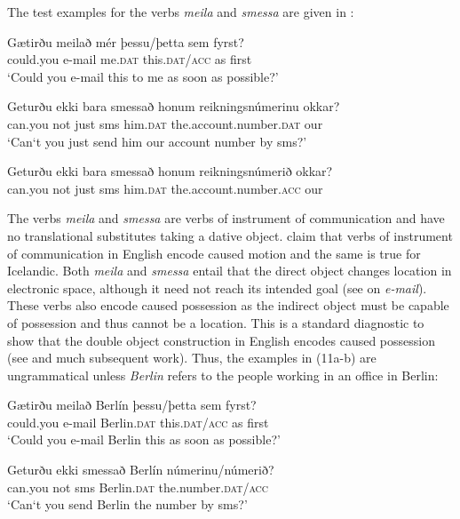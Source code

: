 \documentclass[output=paper,modfonts,nonflat]{langsci/langscibook}
\begin{document}
The test examples for the verbs \textit{meila} and \textit{smessa} are given in :

\ea%
    \label{ex:jonsson:10}  
\ea
\gll  Gætirðu  meilað  mér  þessu/þetta  sem  fyrst?\\
   could.you  e-mail  me.\textsc{dat}  this.\textsc{dat/acc}  as  first\\
\glt `Could you e-mail this to me as soon as possible?' 

\ex
\gll   Geturðu  ekki  bara  smessað  honum  reikningsnúmerinu  okkar?\\
 can.you  not  just  sms  him.\textsc{dat}  the.account.number.\textsc{dat}  our\\
\glt `Can‘t you just send him our account number by sms?' 

\ex
\gll   Geturðu  ekki  bara  smessað  honum  reikningsnúmerið  okkar?\\
 can.you  not  just  sms  him.\textsc{dat}  the.account.number.\textsc{acc}  our\\
\z
\z
 
The verbs \textit{meila} and \textit{smessa} are verbs of instrument of communication and have no translational substitutes taking a dative object.  \citet{RappaportHovavLevin2008} claim that verbs of instrument of communication in English encode caused motion and the same is true for Icelandic. Both \textit{meila} and \textit{smessa} entail that the direct object changes location in electronic space, although it need not reach its intended goal (see \citealt{Beavers2011} on \textit{e-mail}). These verbs also encode caused possession as the indirect object must be capable of possession and thus cannot be a location. This is a standard diagnostic to show that the double object construction in English encodes caused possession (see \citealt{Green1974} and much subsequent work). Thus, the examples in (11a-b) are ungrammatical unless \textit{Berlin} refers to the people working in an office in Berlin: 

 
\ea%
    \label{ex:jonsson:11} 
\ea
\gll  *Gætirðu  meilað  Berlín  þessu/þetta  sem  fyrst?\\
   could.you  e-mail  Berlin.\textsc{dat}  this.\textsc{dat/acc}  as  first\\
\glt `Could you e-mail Berlin this as soon as possible?' 

\ex
\gll   *Geturðu  ekki  smessað  Berlín  númerinu/númerið?\\
 can.you  not  sms  Berlin.\textsc{dat}  the.number.\textsc{dat/acc}\\
\glt `Can‘t you send Berlin the number by sms?'
\z
\z
\end{document}
